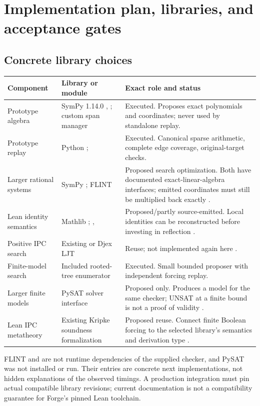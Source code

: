 \section{Implementation plan, libraries, and acceptance gates}
\label{sec:engineering}

\subsection{Concrete library choices}
\begin{longtable}{@{}P{0.20\textwidth}P{0.31\textwidth}P{0.41\textwidth}@{}}
\toprule
Component & Library or module & Exact role and status \\
\midrule
\endhead
Prototype algebra & SymPy 1.14.0 , ; custom span manager & Executed. Proposes exact polynomials and coordinates; never used by standalone replay. \\
Prototype replay & Python ;  & Executed. Canonical sparse arithmetic, complete edge coverage, original-target checks. \\
Larger rational systems & SymPy ; FLINT  & Proposed search optimization. Both have documented exact-linear-algebra interfaces; emitted coordinates must still be multiplied back exactly \cite{domainmatrix,flint}. \\
Lean identity semantics & Mathlib ; ,  & Proposed/partly source-emitted. Local identities can be reconstructed before investing in reflection \cite{mvpoly}. \\
Positive IPC search & Existing  or Djex LJT & Reuse; not implemented again here \cite{itauto,djex-formula}. \\
Finite-model search & Included rooted-tree enumerator & Executed. Small bounded proposer with independent forcing replay. \\
Larger finite models & PySAT solver interface & Proposed only. Produces a model for the same checker; UNSAT at a finite bound is not a proof of validity \cite{pysat}. \\
Lean IPC metatheory & Existing Kripke soundness formalization & Proposed reuse. Connect finite Boolean forcing to the selected library's semantics and derivation type \cite{trufas}. \\
\bottomrule
\end{longtable}

FLINT and  are not runtime dependencies of the supplied
checker, and PySAT was not installed or run. Their entries are concrete next
implementations, not hidden explanations of the observed timings. A production
integration must pin actual compatible library revisions; current documentation
is not a compatibility guarantee for Forge's pinned Lean toolchain.

